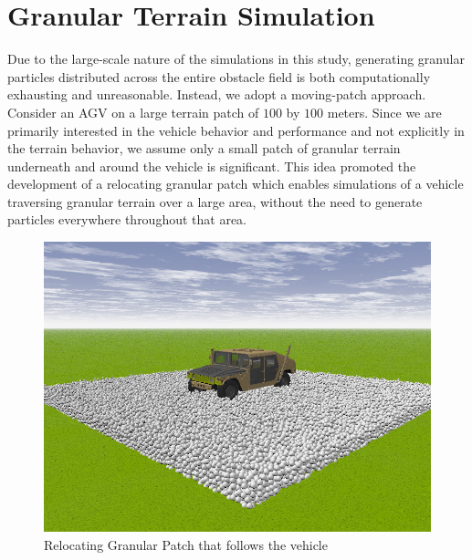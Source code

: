 \documentclass[12pt,onecolumn]{report}
\begin{document}

\section{Granular Terrain Simulation}\label{s:GranSim}

Due to the large-scale nature of the simulations in this study, generating granular particles distributed across the entire obstacle field is both computationally exhausting and unreasonable. Instead, we adopt a moving-patch approach. Consider an AGV on a large terrain patch of $100$ by $100$ meters. Since we are primarily interested in the vehicle behavior and performance and not explicitly in the terrain behavior, we assume only a small patch of granular terrain underneath and around the vehicle is significant. This idea promoted the development of a relocating granular patch which enables simulations of a vehicle traversing granular terrain over a large area, without the need to generate particles everywhere throughout that area. 

\begin{figure}
	\centering
	\includegraphics[width=0.8\columnwidth]{Figs/granPatch.png}
	\caption{\small Relocating Granular Patch that follows the vehicle}  
	\label{fig:granPatch}
\end{figure}

\end{document}
